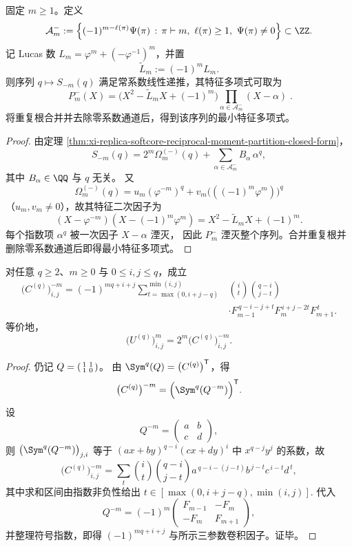 \begin{theorem}\label{thm:xi-replica-softcore-reciprocal-moment-q-recurrence}
固定 \(m\ge1\)。定义
\[
\mathcal A_m^{-}:=
\Bigl\{
(-1)^{m-\ell(\pi)}\Psi(\pi)\,:\,
\pi\vdash m,\ \ell(\pi)\ge1,\ \Psi(\pi)\neq0
\Bigr\}\subset\ZZ.
\]
记 Lucas 数 \(L_m=\varphi^m+(-\varphi^{-1})^m\)，并置
\[
\widetilde L_m:=(-1)^mL_m.
\]
则序列 \(q\mapsto S_{-m}(q)\) 满足常系数线性递推，其特征多项式可取为
\[
\boxed{\;
P_m^{-}(X)=\bigl(X^2-\widetilde L_m X+(-1)^m\bigr)
\prod_{\alpha\in\mathcal A_m^{-}}(X-\alpha)\; }.
\]
将重复根合并并去除零系数通道后，得到该序列的最小特征多项式。
\end{theorem}
\begin{proof}
由定理 \ref{thm:xi-replica-softcore-reciprocal-moment-partition-closed-form}，
\[
S_{-m}(q)=2^m\Omega_m^{(-)}(q)+\sum_{\alpha\in\mathcal A_m^{-}}B_\alpha\,\alpha^q,
\]
其中 \(B_\alpha\in\QQ\) 与 \(q\) 无关。
又
\[
\Omega_m^{(-)}(q)
=u_m(\varphi^{-m})^q+v_m\bigl(((-1)^m\varphi^{m})\bigr)^q
\]
（\(u_m,v_m\neq0\)），故其特征二次因子为
\[
(X-\varphi^{-m})(X-(-1)^m\varphi^m)
=X^2-\widetilde L_m X+(-1)^m.
\]
每个指数项 \(\alpha^q\) 被一次因子 \(X-\alpha\) 湮灭，
因此 \(P_m^{-}\) 湮灭整个序列。合并重复根并删除零系数通道后即得最小特征多项式。
\end{proof}

\begin{theorem}[逆二项矩阵负幂的逐项卷积闭式]\label{thm:xi-replica-softcore-binomial-inverse-negative-power-entrywise}
对任意 \(q\ge2\)、\(m\ge0\) 与 \(0\le i,j\le q\)，成立
\[
\boxed{
\begin{aligned}
\bigl(C^{(q)}\bigr)^{-m}_{i,j}
=(-1)^{mq+i+j}
\sum_{t=\max(0,i+j-q)}^{\min(i,j)}
&\binom{i}{t}\binom{q-i}{j-t}\\
&\cdot F_{m-1}^{\,q-i-j+t}
F_m^{\,i+j-2t}
F_{m+1}^{\,t}.
\end{aligned}
}
\]
等价地，
\[
\bigl(U^{(q)}\bigr)^m_{i,j}=2^m\bigl(C^{(q)}\bigr)^{-m}_{i,j}.
\]
\end{theorem}
\begin{proof}
仍记
\(
Q=\begin{psmallmatrix}1&1\\1&0\end{psmallmatrix}
\)。
由 \(\Sym^q(Q)=\bigl(C^{(q)}\bigr)^{\mathsf T}\)，得
\[
\bigl(C^{(q)}\bigr)^{-m}
=\Bigl(\Sym^q(Q^{-m})\Bigr)^{\mathsf T}.
\]
设
\[
Q^{-m}=
\begin{pmatrix}
a&b\\ c&d
\end{pmatrix},
\]
则 \(\bigl(\Sym^q(Q^{-m})\bigr)_{j,i}\) 等于
\(
(ax+by)^{q-i}(cx+dy)^i
\)
中 \(x^{q-j}y^j\) 的系数，故
\[
\bigl(C^{(q)}\bigr)^{-m}_{i,j}
=\sum_{t}
\binom{i}{t}\binom{q-i}{j-t}
a^{\,q-i-(j-t)}b^{\,j-t}c^{\,i-t}d^{\,t},
\]
其中求和区间由指数非负性给出
\(
t\in[\max(0,i+j-q),\min(i,j)].
\)
代入
\[
Q^{-m}=(-1)^m
\begin{pmatrix}
F_{m-1}&-F_m\\ -F_m&F_{m+1}
\end{pmatrix},
\]
并整理符号指数，即得
\(
(-1)^{mq+i+j}
\)
与所示三参数卷积因子。证毕。
\end{proof}

\endinput

